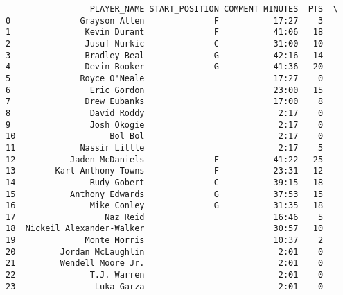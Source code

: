 \begin{verbatim}
                 PLAYER_NAME START_POSITION COMMENT MINUTES  PTS  \
0              Grayson Allen              F           17:27    3   
1               Kevin Durant              F           41:06   18   
2               Jusuf Nurkic              C           31:00   10   
3               Bradley Beal              G           42:16   14   
4               Devin Booker              G           41:36   20   
5              Royce O'Neale                          17:27    0   
6                Eric Gordon                          23:00   15   
7               Drew Eubanks                          17:00    8   
8                David Roddy                           2:17    0   
9                Josh Okogie                           2:17    0   
10                   Bol Bol                           2:17    0   
11             Nassir Little                           2:17    5   
12           Jaden McDaniels              F           41:22   25   
13        Karl-Anthony Towns              F           23:31   12   
14               Rudy Gobert              C           39:15   18   
15           Anthony Edwards              G           37:53   15   
16               Mike Conley              G           31:35   18   
17                  Naz Reid                          16:46    5   
18  Nickeil Alexander-Walker                          30:57   10   
19              Monte Morris                          10:37    2   
20         Jordan McLaughlin                           2:01    0   
21         Wendell Moore Jr.                           2:01    0   
22               T.J. Warren                           2:01    0   
23                Luka Garza                           2:01    0   


\end{verbatim}
